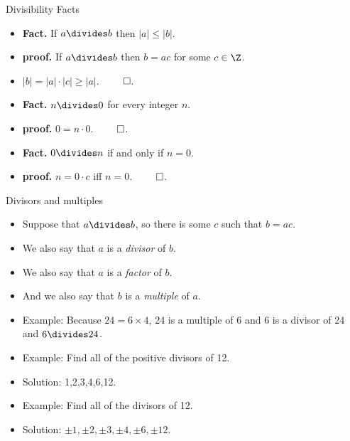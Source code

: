 \documentclass[handout]{beamer}
\begin{document}
\begin{frame}{Divisibility Facts}

\begin{itemize}
  \item \textbf{Fact.} If $a\divides b$ then $|a|\leq |b|$.
  \item \textbf{proof.} If $a\divides b$ then $b = a c$ for some $c\in\Z$.
  \item $|b| = |a| \cdot |c| \geq |a|$. $\qed$.
  \item \textbf{Fact.} $n \divides 0$ for every integer $n$.
  \item \textbf{proof.} $0 = n \cdot 0$. $\qed$.
  \item \textbf{Fact.} $0 \divides n$ if and only if $n=0$.
  \item \textbf{proof.} $n = 0 \cdot c$ iff $n=0$. $\qed$.
\end{itemize}

\end{frame}


\begin{frame}{Divisors and multiples}

\begin{itemize}
  \item Suppose that $a\divides b$, so there is some $c$ such that $b = ac$.
  \item We also say that $a$ is a \emph{divisor} of $b$.
  \item We also say that $a$ is a \emph{factor} of $b$.
  \item And we also say that $b$ is a \emph{multiple} of $a$.
  \item Example: Because $24 = 6 \times 4$, 24 is a multiple of 6 and 6 is
  a divisor of 24 and $6\divides 24$.
  \item Example: Find all of the positive divisors of 12.
  \item Solution: 1,2,3,4,6,12.
  \item Example: Find all of the divisors of 12.
  \item Solution: $\pm 1, \pm 2, \pm 3, \pm 4, \pm 6, \pm 12$.
\end{itemize}

\end{frame}

\end{document}
